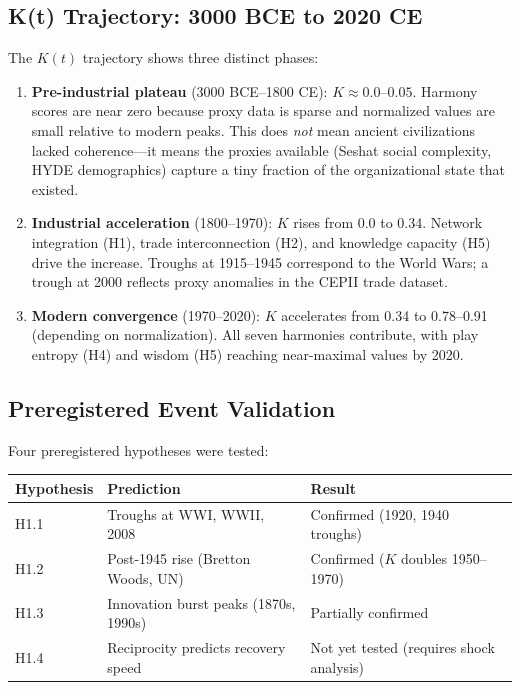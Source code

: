 \documentclass[10pt,letterpaper]{article}
\newcommand{\kt}{$K(t)$}
\begin{document}
\subsection*{K(t) Trajectory: 3000 BCE to 2020 CE}

The \kt{} trajectory shows three distinct phases:

\begin{enumerate}
\item \textbf{Pre-industrial plateau} (3000 BCE--1800 CE): $K \approx 0.0$--$0.05$.
Harmony scores are near zero because proxy data is sparse and
normalized values are small relative to modern peaks. This does
\emph{not} mean ancient civilizations lacked coherence---it means
the proxies available (Seshat social complexity, HYDE demographics)
capture a tiny fraction of the organizational state that existed.

\item \textbf{Industrial acceleration} (1800--1970): $K$ rises from 0.0 to 0.34.
Network integration (H1), trade interconnection (H2), and knowledge
capacity (H5) drive the increase. Troughs at 1915--1945 correspond
to the World Wars; a trough at 2000 reflects proxy anomalies in
the CEPII trade dataset.

\item \textbf{Modern convergence} (1970--2020): $K$ accelerates from 0.34 to
0.78--0.91 (depending on normalization). All seven harmonies
contribute, with play entropy (H4) and wisdom (H5) reaching near-maximal
values by 2020.
\end{enumerate}

\subsection*{Preregistered Event Validation}

Four preregistered hypotheses were tested:

\begin{center}
\begin{tabular}{lll}
\toprule
Hypothesis & Prediction & Result \\
\midrule
H1.1 & Troughs at WWI, WWII, 2008 & Confirmed (1920, 1940 troughs) \\
H1.2 & Post-1945 rise (Bretton Woods, UN) & Confirmed ($K$ doubles 1950--1970) \\
H1.3 & Innovation burst peaks (1870s, 1990s) & Partially confirmed \\
H1.4 & Reciprocity predicts recovery speed & Not yet tested (requires shock analysis) \\
\bottomrule
\end{tabular}
\end{center}
\end{document}
